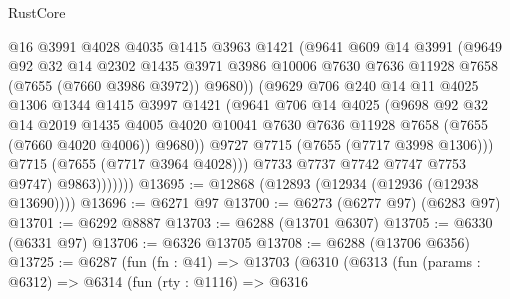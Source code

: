 \begin{lexlean}{RustCore}
\begin{coremodule}
                      @16
                      @3991
                      @4028
                      @4035
                      @1415
                      @3963
                      @1421
                      (@9641
                        @609
                        @14
                        @3991
                        (@9649
                          @92
                          @32
                          @14
                          @2302
                          @1435
                          @3971
                          @3986
                          @10006
                          @7630
                          @7636
                          @11928
                          @7658
                          (@7655 (@7660 @3986 @3972))
                          @9680))
                      (@9629
                        @706
                        @240
                        @14
                        @11
                        @4025
                        @1306
                        @1344
                        @1415
                        @3997
                        @1421
                        (@9641
                          @706
                          @14
                          @4025
                          (@9698
                            @92
                            @32
                            @14
                            @2019
                            @1435
                            @4005
                            @4020
                            @10041
                            @7630
                            @7636
                            @11928
                            @7658
                            (@7655 (@7660 @4020 @4006))
                            @9680))
                        @9727
                        @7715
                        (@7655 (@7717 @3998 @1306)))
                      @7715
                      (@7655 (@7717 @3964 @4028)))
                    @7733
                    @7737
                    @7742
                    @7747
                    @7753
                    @9747)
                  @9863)))))))
@13695 := @12868 (@12893 (@12934 (@12936 (@12938 @13690))))
@13696 := @6271 @97
@13700 := @6273 (@6277 @97) (@6283 @97)
@13701 := @6292 @8887
@13703 := @6288 (@13701 @6307)
@13705 := @6330 (@6331 @97)
@13706 := @6326 @13705
@13708 := @6288 (@13706 @6356)
@13725 := @6287
    (fun (fn : @41) =>
    @13703
      (@6310
        (@6313
          (fun (params : @6312) =>
          @6314
            (fun (rty : @1116) =>
            @6316

\end{coremodule}
\end{lexlean}

